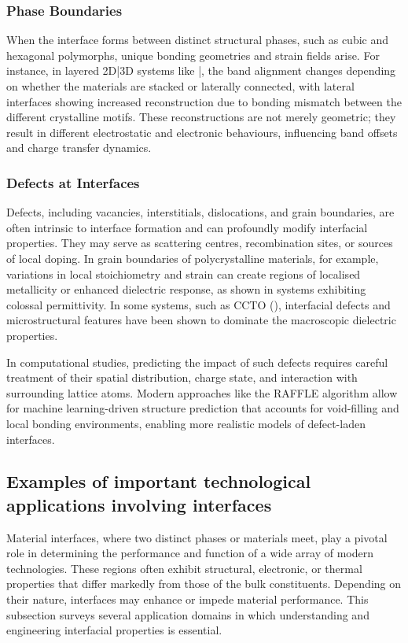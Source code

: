 \subsubsection{Phase Boundaries} 
 
When the interface forms between distinct structural phases, such as cubic and hexagonal polymorphs, unique bonding geometries and strain fields arise. For instance, in layered 2D|3D systems like |, the band alignment changes depending on whether the materials are stacked or laterally connected, with lateral interfaces showing increased reconstruction due to bonding mismatch between the different crystalline motifs. These reconstructions are not merely geometric; they result in different electrostatic and electronic behaviours, influencing band offsets and charge transfer dynamics. 
 
\subsubsection{Defects at Interfaces} 
 
Defects, including vacancies, interstitials, dislocations, and grain boundaries, are often intrinsic to interface formation and can profoundly modify interfacial properties. They may serve as scattering centres, recombination sites, or sources of local doping. In grain boundaries of polycrystalline materials, for example, variations in local stoichiometry and strain can create regions of localised metallicity or enhanced dielectric response, as shown in systems exhibiting colossal permittivity. In some systems, such as CCTO (), interfacial defects and microstructural features have been shown to dominate the macroscopic dielectric properties. 
 
In computational studies, predicting the impact of such defects requires careful treatment of their spatial distribution, charge state, and interaction with surrounding lattice atoms. Modern approaches like the RAFFLE algorithm allow for machine learning-driven structure prediction that accounts for void-filling and local bonding environments, enabling more realistic models of defect-laden interfaces. 
 
\subsection{Examples of important technological applications involving interfaces} 
 
Material interfaces, where two distinct phases or materials meet, play a pivotal role in determining the performance and function of a wide array of modern technologies. These regions often exhibit structural, electronic, or thermal properties that differ markedly from those of the bulk constituents. Depending on their nature, interfaces may enhance or impede material performance. This subsection surveys several application domains in which understanding and engineering interfacial properties is essential. 
 
